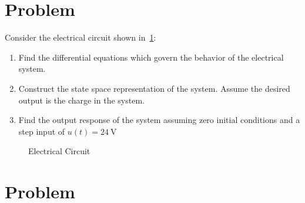 \documentclass[11pt, reqno]{article}    %
\begin{document}
\section{Problem}
Consider the electrical circuit shown in~\cref{fig:elec_circuit}:
\begin{enumerate}
    \item Find the differential equations which govern the behavior of the electrical system.
    \item Construct the state space representation of the system. 
        Assume the desired output is the charge in the system.
    \item Find the output response of the system assuming zero initial conditions and a step input of \(u(t) = \SI{24}{\volt}\)
\end{enumerate}
\begin{figure}[htbp]
\centering
\begin{scaletikzpicturetowidth}{0.5\textwidth}
\end{scaletikzpicturetowidth}
\caption{Electrical Circuit~\label{fig:elec_circuit}}
\end{figure}
\clearpage

\section{Problem}
\end{document}
